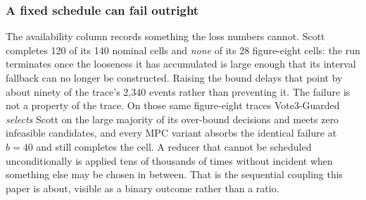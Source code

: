 \documentclass[letterpaper, 10 pt, conference]{ieeeconf}  %
\begin{document}
\subsubsection*{A fixed schedule can fail outright}
The availability column records something the loss numbers cannot.
Scott completes 120 of its 140 nominal cells and \emph{none} of its 28 figure-eight cells: the run terminates once the looseness it has accumulated is large enough that its interval fallback can no longer be constructed.
Raising the bound delays that point by about ninety of the trace's 2{,}340 events rather than preventing it.
The failure is not a property of the trace.
On those same figure-eight traces Vote3-Guarded \emph{selects} Scott on the large majority of its over-bound decisions and meets zero infeasible candidates, and every MPC variant absorbs the identical failure at $b{=}40$ and still completes the cell.
A reducer that cannot be scheduled unconditionally is applied tens of thousands of times without incident when something else may be chosen in between.
That is the sequential coupling this paper is about, visible as a binary outcome rather than a ratio.
\end{document}
